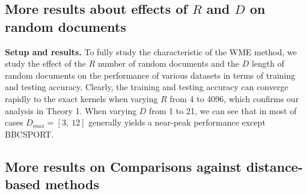\documentclass[11pt,a4paper]{article}
\newcommand{\1}{\boldsymbol{1}}
\begin{document}
\subsection{More results about effects of $R$ and $D$ on random documents}
\label{App:More results about effects of $R$ and $D$ on random documents}

\textbf{Setup and results.} To fully study the characteristic of the WME method, we study the effect of the $R$ number of random documents and the $D$ length of random documents on the performance of various datasets in terms of training and testing accuracy. Clearly, the training and testing accuracy can converge rapidly to the exact kernels when varying $R$ from 4 to 4096, which confirms our analysis in Theory 1. When varying $D$ from 1 to 21, we can see that in most of cases $D_{max} = [3, \ 12]$ generally yields a near-peak performance except BBCSPORT.


\subsection{More results on Comparisons against distance-based methods}
\label{App:More results on Comparisons against distance-based methods}
\end{document}
